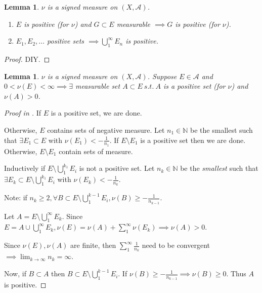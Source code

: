 \documentclass{report}
\newcommand{\N}{\mathbb{N}}
\newcommand{\st}{\ s.t.\ }
\newcommand{\cA}{\mathcal{A}}
\newtheorem{lemma}[theorem]{Lemma}
\theoremstyle{definition}
\theoremstyle{remark}
\begin{document}
\begin{lemma}
	$\nu$ is a signed measure on $(X, \cA)$.
	\begin{enumerate}
		\item $E$ is positive (for $\nu$) and $G \subset E$ measurable $\implies G$ is positive (for $\nu$).
		\item $E_1, E_2, \ldots$ positive sets $\implies \displaystyle \bigcup_1^\infty E_n$ is positive.
	\end{enumerate}
\end{lemma}
\begin{proof}
	DIY.
\end{proof}

\begin{lemma}
	$\nu$ is a signed measure on $(X, \cA)$. Suppose $E \in \cA$ and $0 < \nu(E) < \infty \implies \exists$ measurable set $A \subset E \st A$ is a positive set (for $\nu$) and $\nu(A) > 0$.
\end{lemma}
\begin{proof}[Proof in \cite{roydenRealAnalysis2010}]
	If $E$ is a positive set, we are done.

	Otherwise, $E$ contains sets of negative measure. Let $n_1 \in \N$ be the smallest such that $\exists E_1 \subset E$ with $\nu(E_1) < - \frac{1}{n_1}$. If $E \setminus E_1$ is a positive set then we are done. Otherwise, $E \setminus E_1$ contain sets of measure.

	Inductively if $E \setminus \bigcup_1^{k_1} E_i$ is not a positive set. Let $n_k \in \N$ be the \emph{smallest} such that $\exists E_k \subset E \setminus \bigcup_1^{k_1} E_i$ with $\nu(E_k) < - \frac{1}{n_k}$.

	Note: if $n_k \geq 2, \forall B \subset E \setminus \bigcup_1^{k-1}E_i, \nu(B) \geq  - \frac{1}{n_{k-1}}$.

	Let $A = E \setminus \bigcup_1^\infty E_k$. Since $E = A \cup \bigcup_1^\infty E_k, \nu(E) = \nu(A) + \sum_1^\infty \nu(E_k) \implies \nu(A) > 0$.

	Since $\nu(E), \nu(A)$ are finite, then $\sum_1^\infty \frac{1}{n_k}$ need to be convergent $\implies \lim_{k \to \infty} n_k = \infty$.

	Now, if $B \subset A$ then $B \subset E \setminus \bigcup_1^{k - 1}E_i$. If $\nu(B) \geq -\frac{1}{n_{k-1}} \implies \nu(B) \geq 0$. Thus $A$ is positive.
\end{proof}
\end{document}
